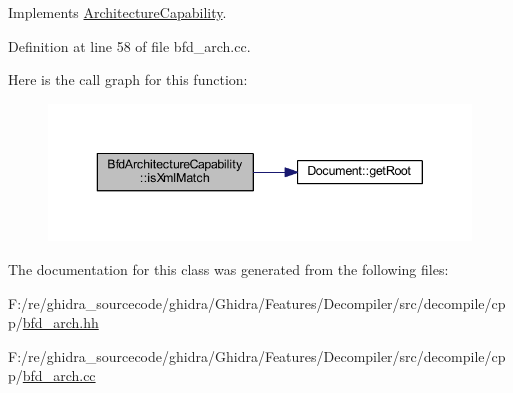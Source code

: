 Implements \mbox{\hyperlink{class_architecture_capability_a653243b342d480273e0f04f7194094b8}{Architecture\+Capability}}.



Definition at line 58 of file bfd\+\_\+arch.\+cc.

Here is the call graph for this function\+:
\nopagebreak
\begin{figure}[H]
\begin{center}
\leavevmode
\includegraphics[width=343pt]{class_bfd_architecture_capability_aa5231740c6fb12308f8e9a31ea291cf4_cgraph}
\end{center}
\end{figure}


The documentation for this class was generated from the following files\+:\begin{DoxyCompactItemize}
\item 
F\+:/re/ghidra\+\_\+sourcecode/ghidra/\+Ghidra/\+Features/\+Decompiler/src/decompile/cpp/\mbox{\hyperlink{bfd__arch_8hh}{bfd\+\_\+arch.\+hh}}\item 
F\+:/re/ghidra\+\_\+sourcecode/ghidra/\+Ghidra/\+Features/\+Decompiler/src/decompile/cpp/\mbox{\hyperlink{bfd__arch_8cc}{bfd\+\_\+arch.\+cc}}\end{DoxyCompactItemize}
